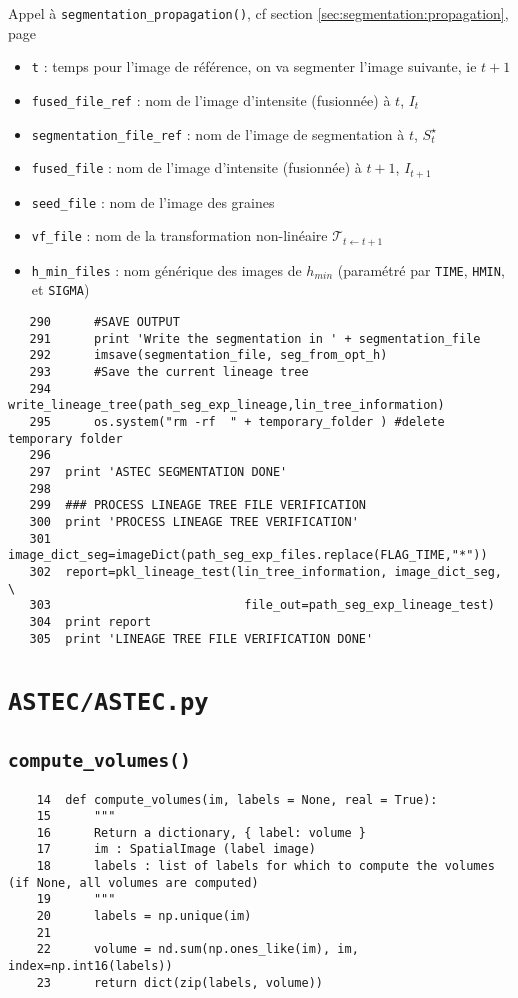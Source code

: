 \documentclass{article}
\def \mycolor {red}
\begin{document}
\color{\mycolor}
Appel \`a \texttt{segmentation\_propagation()}, cf section \ref{sec:segmentation:propagation}, page \pageref{sec:segmentation:propagation}
\begin{itemize}
\itemsep -0.5ex
\item \verb|t| : temps pour l'image de r\'ef\'erence, on va segmenter l'image suivante, ie $t+1$
\item \verb|fused_file_ref| : nom de l'image d'intensite (fusionn\'ee) \`a $t$, $I_t$
\item \verb|segmentation_file_ref| : nom de l'image de segmentation \`a $t$, $S^{\star}_t$
\item \verb|fused_file| : nom de l'image d'intensite (fusionn\'ee) \`a $t+1$, $I_{t+1}$
\item \verb|seed_file| : nom de l'image des graines
\item \verb|vf_file| : nom de la  transformation non-lin\'eaire $\mathcal{T}_{t \leftarrow t+1}$
\item \verb|h_min_files| : nom g\'en\'erique des images de $h_{min}$ (param\'etr\'e par \verb|TIME|, \verb|HMIN|, et \verb|SIGMA|)
\end{itemize}
\color{black}
\begin{verbatim} 
   290	    #SAVE OUTPUT
   291	    print 'Write the segmentation in ' + segmentation_file
   292	    imsave(segmentation_file, seg_from_opt_h)
   293	    #Save the current lineage tree
   294	    write_lineage_tree(path_seg_exp_lineage,lin_tree_information) 
   295	    os.system("rm -rf  " + temporary_folder ) #delete temporary folder
   296	
   297	print 'ASTEC SEGMENTATION DONE'
   298	
   299	### PROCESS LINEAGE TREE FILE VERIFICATION
   300	print 'PROCESS LINEAGE TREE VERIFICATION'
   301	image_dict_seg=imageDict(path_seg_exp_files.replace(FLAG_TIME,"*"))
   302	report=pkl_lineage_test(lin_tree_information, image_dict_seg, \
   303	                         file_out=path_seg_exp_lineage_test)
   304	print report
   305	print 'LINEAGE TREE FILE VERIFICATION DONE'
\end{verbatim}





\section{\texttt{ASTEC/ASTEC.py}}

\subsection{\texttt{compute\_volumes()}}
\begin{verbatim}
    14	def compute_volumes(im, labels = None, real = True):
    15	    """
    16	    Return a dictionary, { label: volume }
    17	    im : SpatialImage (label image)
    18	    labels : list of labels for which to compute the volumes (if None, all volumes are computed)
    19	    """
    20	    labels = np.unique(im)
    21	
    22	    volume = nd.sum(np.ones_like(im), im, index=np.int16(labels))
    23	    return dict(zip(labels, volume))
\end{verbatim}
\end{document}
